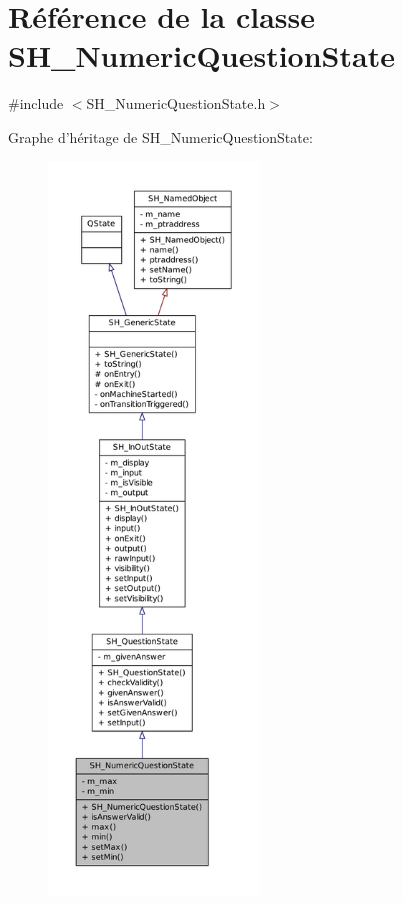 \hypertarget{classSH__NumericQuestionState}{\section{Référence de la classe S\-H\-\_\-\-Numeric\-Question\-State}
\label{classSH__NumericQuestionState}
}


{\ttfamily \#include $<$S\-H\-\_\-\-Numeric\-Question\-State.\-h$>$}



Graphe d'héritage de S\-H\-\_\-\-Numeric\-Question\-State\-:\nopagebreak
\begin{figure}[H]
\begin{center}
\leavevmode
\includegraphics[height=550pt]{classSH__NumericQuestionState__inherit__graph}
\end{center}
\end{figure}



